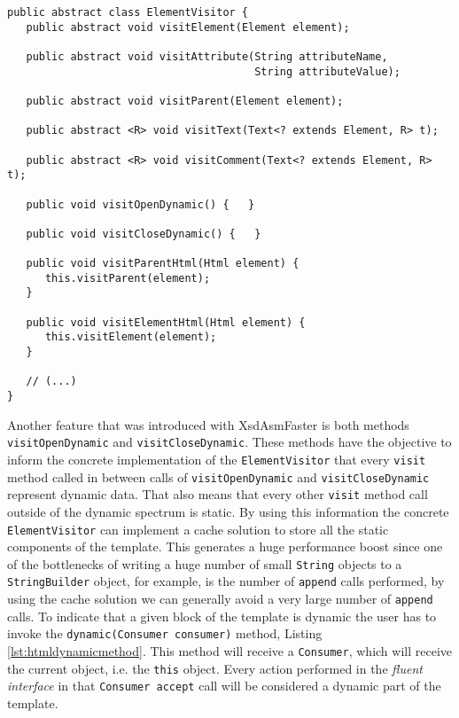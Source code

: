 \bigskip


\begin{minipage}{\linewidth}
\begin{lstlisting}[caption={ElementVisitor generated by XsdAsmFaster},label={lst:elementvisitorxsdasmfaster}]
public abstract class ElementVisitor {
   public abstract void visitElement(Element element);

   public abstract void visitAttribute(String attributeName, 
                                       String attributeValue);

   public abstract void visitParent(Element element);

   public abstract <R> void visitText(Text<? extends Element, R> t);

   public abstract <R> void visitComment(Text<? extends Element, R> t);

   public void visitOpenDynamic() {   }

   public void visitCloseDynamic() {   }

   public void visitParentHtml(Html element) {
      this.visitParent(element);
   }
   
   public void visitElementHtml(Html element) {
      this.visitElement(element);
   }
   
   // (...)
}
\end{lstlisting}
\end{minipage}

\noindent
Another feature that was introduced with XsdAsmFaster is both methods \texttt{visitOpenDynamic} and \texttt{visitCloseDynamic}. These methods have the objective to inform the concrete implementation of the \texttt{ElementVisitor} that every \texttt{visit} method called in between calls of \texttt{visitOpenDynamic} and \texttt{visitCloseDynamic} represent dynamic data. That also means that every other \texttt{visit} method call outside of the dynamic spectrum is static. By using this information the concrete \texttt{ElementVisitor} can implement a cache solution to store all the static components of the template. This generates a huge performance boost since one of the bottlenecks of writing a huge number of small \texttt{String} objects to a \texttt{StringBuilder} object, for example, is the number of \texttt{append} calls performed, by using the cache solution we can generally avoid a very large number of \texttt{append} calls. To indicate that a given block of the template is dynamic the user has to invoke the \texttt{dynamic(Consumer consumer)} method, Listing \ref{lst:htmldynamicmethod}. This method will receive a \texttt{Consumer}, which will receive the current object, i.e. the \texttt{this} object. Every action performed in the \textit{fluent interface} in that \texttt{Consumer accept} call will be considered a dynamic part of the template.

